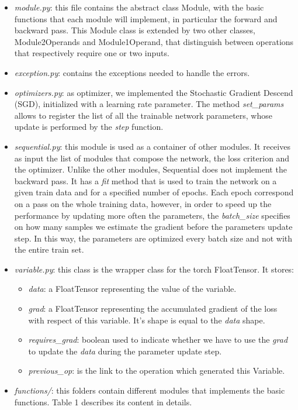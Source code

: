 \documentclass[10pt,conference,compsocconf]{IEEEtran}
\begin{document}
\begin{itemize}
	\item \textit{module.py}: this file contains the abstract class Module, with the basic functions that each module will implement, in particular the forward and backward pass. This Module class is extended by two other classes, Module2Operands and Module1Operand, that distinguish between operations that respectively require one or two inputs. 
	
	\item \textit{exception.py}: contains the exceptions needed to handle the errors.
	
	\item \textit{optimizers.py}: as optimizer, we implemented the Stochastic Gradient Descend (SGD), initialized with a learning rate parameter. The method \textit{set\_params} allows to register the list of all the trainable network parameters, whose update is performed by the \textit{step} function.
	
	\item \textit{sequential.py}: this module is used as a container of other modules. It receives as input the list of modules that compose the network, the loss criterion and the optimizer. Unlike the other modules, Sequential does not implement the backward pass. It has a \textit{fit} method that is used to train the network on a given train data and for a specified number of epochs. Each epoch correspond on a pass on the whole training data, however, in order to speed up the performance by updating more often the parameters, the \textit{batch\_size} specifies on how many samples we estimate the gradient before the parameters update step. In this way, the parameters are optimized every batch size and not with the entire train set.
	
	\item \textit{variable.py}: this class is the wrapper class for the torch FloatTensor. It stores:
	\begin{itemize}
        \item \textit{data}: a FloatTensor representing the value of the variable.
		\item \textit{grad}: a FloatTensor representing the accumulated gradient of the loss with respect of this variable. It's shape is equal to the \textit{data} shape.
		\item \textit{requires\_grad}: boolean used to indicate whether we have to use the \textit{grad} to update the \textit{data} during the parameter update step.
		\item \textit{previous\_op}: is the link to the operation which generated this Variable.
	\end{itemize}
	
	\item \textit{functions/}: this folders contain different modules that implements the basic functions. Table 1  describes its content in details.
\end{itemize}
\end{document}

